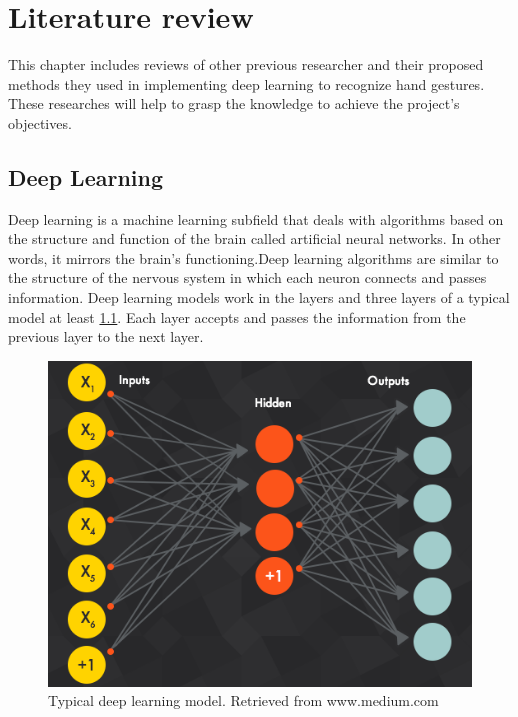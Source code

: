 \documentclass[12pt]{report}
\begin{document}
\chapter{Literature review}

This chapter includes reviews of other previous researcher
and their proposed methods they used in implementing deep learning
to recognize hand gestures. These researches will help to grasp the knowledge
to achieve the project's objectives. 

\section{Deep Learning}
    Deep learning is a machine learning subfield that deals with algorithms based 
    on the structure and function of the brain called artificial neural networks. 
    In other words, it mirrors the brain's functioning.Deep learning algorithms are similar to the structure of 
    the nervous system in which each neuron connects and passes information.
    Deep learning models work in the layers and three layers of a typical model at least \ref{fig:deep_learining}. 
    Each layer accepts and passes the information from the previous layer to the next layer.

    \begin{figure} [h]
        \centering
        \includegraphics[width=\textwidth]{./images/deep_learning.png}
        \caption{Typical deep learning model. Retrieved from www.medium.com}
        \label{fig:deep_learining}
    \end{figure}
\end{document}
